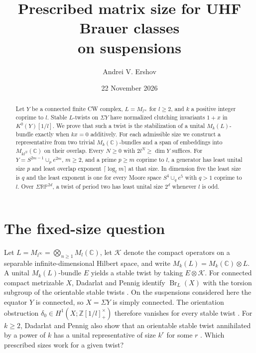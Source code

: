 \documentclass[11pt]{article}
\title{Prescribed matrix size for UHF Brauer classes\\ on suspensions}
\author{Andrei V. Ershov}
\date{22 November 2026}
\DeclareMathOperator{\Br}{Br}
\newcommand{\K}{\mathcal K}
\newcommand{\Z}{\mathbb Z}
\newcommand{\C}{\mathbb C}
\newcommand{\RP}{\mathbb{RP}}
\begin{document}
\maketitle
\begin{abstract}
Let \(Y\) be a connected finite CW complex, \(L=M_{l^\infty}\) for \(l\geq2\), and \(k\) a positive integer coprime to \(l\). Stable \(L\)-twists on \(\Sigma Y\) have normalized clutching invariants \(1+x\) in \(K^0(Y)[1/l]\). We prove that such a twist is the stabilization of a unital \(M_k(L)\)-bundle exactly when \(kx=0\) additively. For each admissible size we construct a representative from two trivial \(M_k(\C)\)-bundles and a span of embeddings into \(M_{kl^N}(\C)\) on their overlap. Every \(N\geq0\) with \(2l^N\geq\dim Y\) suffices. For \(Y=S^{2m-1}\cup_p e^{2m}\), \(m\geq2\), and a prime \(p\geq m\) coprime to \(l\), a generator has least unital size \(p\) and least overlap exponent \(\lceil\log_l m\rceil\) at that size. In dimension five the least size is \(q\) and the least exponent is one for every Moore space \(S^4\cup_q e^5\) with \(q>1\) coprime to \(l\). Over \(\Sigma\RP^{2d}\), a twist of period two has least unital size \(2^d\) whenever \(l\) is odd.
\end{abstract}

\section{The fixed-size question}\label{sec:intro}

Let \(L=M_{l^\infty}=\bigotimes_{n\geq1}M_l(\C)\), let \(\K\) denote the compact operators on a separable infinite-dimensional Hilbert space, and write \(M_k(L)=M_k(\C)\otimes L\). A unital \(M_k(L)\)-bundle \(E\) yields a stable twist by taking \(E\otimes\K\). For connected compact metrizable \(X\), Dadarlat and Pennig identify \(\Br_L(X)\) with the torsion subgroup of the orientable stable twists \cite[Theorem~2.15(ii)]{DP2}. On the suspensions considered here the equator \(Y\) is connected, so \(X=\Sigma Y\) is simply connected. The orientation obstruction \(\delta_0\in H^1(X;\Z[1/l]^\times_+)\) therefore vanishes for every stable twist \cite[Proposition~2.3]{DP2}. For \(k\geq2\), Dadarlat and Pennig also show that an orientable stable twist annihilated by a power of \(k\) has a unital representative of size \(k^r\) for some \(r\) \cite[Theorem~2.11 and Corollary~2.12]{DP2}. Which prescribed sizes work for a given twist?
\end{document}
